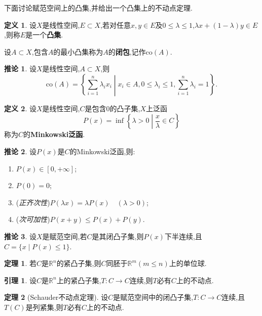 \documentclass{ctexart}
\theoremstyle{definition}
\newtheorem{definition}{定义}
\newtheorem{lemma}{引理}
\newtheorem{theorem}{定理}
\newtheorem{corollary}{推论}
\theoremstyle{remark}
\begin{document}
	下面讨论赋范空间上的凸集,并给出一个凸集上的不动点定理.
	\begin{definition}
		设$X$是线性空间,$E\subset X$,若对任意$x,y\in E$及$0\le\lambda\le 1$,$\lambda x+(1-\lambda)y\in E$,则称$E$是一个\textbf{凸集}.
		
		设$A\subset X$,包含$A$的最小凸集称为$A$的\textbf{闭包},记作$\mathrm{co}(A)$.
	\end{definition}
	\begin{corollary}
		设$X$是线性空间,$A\subset X$,则
		$$\mathrm{co}(A)=\left\{\sum_{i=1}^n{\lambda_ix_i}\middle|x_i\in A,0\le\lambda_i\le 1,\sum_{i=1}^n{\lambda_i}=1\right\}.$$
	\end{corollary}
	\begin{definition}
		设$X$是线性空间,$C$是包含$0$的凸子集,$X$上泛函
		$$P(x)=\inf\left\{\lambda>0\middle|\frac{x}{\lambda}\in C\right\}$$
		称为$C$的\textbf{Minkowski泛函}.
	\end{definition}
	\begin{corollary}
		设$P(x)$是$C$的Minkowski泛函,则:
		\begin{enumerate}
			\item $P(x)\in[0,+\infty]$;
			\item $P(0)=0$;
			\item (\textit{正齐次性})$P(\lambda x)=\lambda P(x)\quad(\lambda>0)$;
			\item (\textit{次可加性})$P(x+y)\le P(x)+P(y)$.
		\end{enumerate}
	\end{corollary}
	\begin{corollary}
		设$X$是赋范空间,若$C$是其闭凸子集,则$P(x)$下半连续,且$C=\{x\mid P(x)\le 1\}$.
	\end{corollary}
	\begin{theorem}
		若$C$是$\mathbb{R}^n$的紧凸子集,则$C$同胚于$\mathbb{R}^m(m\le n)$上的单位球.
	\end{theorem}
	\begin{lemma}
		设$C$是$\mathbb{R}^n$上的紧凸子集,$T:C\to C$连续,则$T$必有$C$上的不动点.
	\end{lemma}
	\begin{theorem}[Schauder不动点定理]
		设$C$是赋范空间中的闭凸子集,$T:C\to C$连续,且$T(C)$是列紧集,则$T$必有$C$上的不动点.
	\end{theorem}
\end{document}
